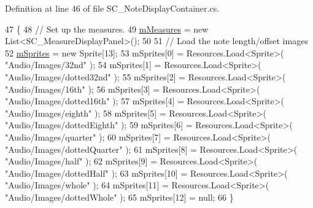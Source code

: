 Definition at line 46 of file S\+C\+\_\+\+Note\+Display\+Container.\+cs.


\begin{DoxyCode}
47     \{
48         \textcolor{comment}{// Set up the measures.}
49         \hyperlink{group___s_c___n_d_c_priv_var_gaa072fb53f6bd6646bc85f2ebc2a02229}{mMeasures} = \textcolor{keyword}{new} List<SC\_MeasureDisplayPanel>();
50 
51         \textcolor{comment}{// Load the note length/offset images}
52         \hyperlink{group___s_c___n_d_c_priv_var_gac8df613ee0996e999278da2b3f523e34}{mSprites} = \textcolor{keyword}{new} Sprite[13];
53         mSprites[0] = Resources.Load<Sprite>( \textcolor{stringliteral}{"Audio/Images/32nd"} );
54         mSprites[1] = Resources.Load<Sprite>( \textcolor{stringliteral}{"Audio/Images/dotted32nd"} );
55         mSprites[2] = Resources.Load<Sprite>( \textcolor{stringliteral}{"Audio/Images/16th"} );
56         mSprites[3] = Resources.Load<Sprite>( \textcolor{stringliteral}{"Audio/Images/dotted16th"} );
57         mSprites[4] = Resources.Load<Sprite>( \textcolor{stringliteral}{"Audio/Images/eighth"} );
58         mSprites[5] = Resources.Load<Sprite>( \textcolor{stringliteral}{"Audio/Images/dottedEighth"} );
59         mSprites[6] = Resources.Load<Sprite>( \textcolor{stringliteral}{"Audio/Images/quarter"} );
60         mSprites[7] = Resources.Load<Sprite>( \textcolor{stringliteral}{"Audio/Images/dottedQuarter"} );
61         mSprites[8] = Resources.Load<Sprite>( \textcolor{stringliteral}{"Audio/Images/half"} );
62         mSprites[9] = Resources.Load<Sprite>( \textcolor{stringliteral}{"Audio/Images/dottedHalf"} );
63         mSprites[10] = Resources.Load<Sprite>( \textcolor{stringliteral}{"Audio/Images/whole"} );
64         mSprites[11] = Resources.Load<Sprite>( \textcolor{stringliteral}{"Audio/Images/dottedWhole"} );
65         mSprites[12] = null;
66     \}
\end{DoxyCode}
